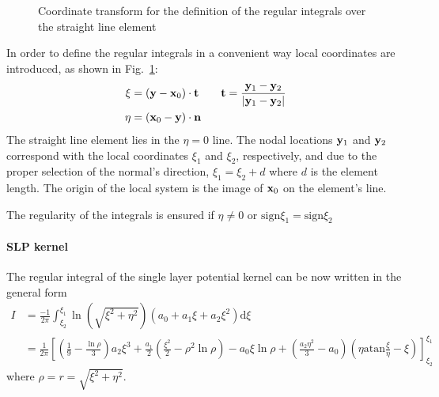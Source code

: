 \documentclass[a4paper,11pt]{article}
\newcommand{\td}{\mathrm{d}}
\newcommand{\sign}{\mathrm{sign}}
\newcommand{\atan}{\mathrm{atan}}
\begin{document}
\begin{figure}
\center
{}
\caption{Coordinate transform for the definition of the regular integrals over the straight line element}
\label{fig:regular_local}
\end{figure}

In order to define the regular integrals in a convenient way local coordinates are introduced, as shown in Fig.~\ref{fig:regular_local}:
%
\begin{align}
\xi &= ({\bf y} - {\bf x}_0) \cdot {\bf t} \qquad {\bf t} = \frac{{\bf y}_1 - {\bf y}_2}{|{\bf y}_1 - {\bf y}_2|} \nonumber \\
\eta &= ({\bf x}_0 - {\bf y}) \cdot {\bf n}
\end{align}
%
The straight line element lies in the $\eta = 0$ line. The nodal locations ${\bf y}_1$ and ${\bf y}_2$ correspond with the local coordinates $\xi_1$ and $\xi_2$, respectively, and due to the proper selection of the normal's direction, $\xi_1 = \xi_2 + d$ where $d$ is the element length. The origin of the local system is the image of ${\bf x}_0$ on the element's line.

The regularity of the integrals is ensured if $\eta \ne 0$ or $\sign \xi_1 = \sign \xi_2$


\paragraph{SLP kernel}

The regular integral of the single layer potential kernel can be now written in the general form
%
\begin{align}
I &= \frac{-1}{2\pi} \int_{\xi_2}^{\xi_1} \ln\left(\sqrt{\xi^2+\eta^2}\right) \left(a_0 + a_1 \xi + a_2 \xi^2\right) \td \xi \\
 &= \frac{1}{2\pi} \left[
\left(\frac{1}{9} - \frac{\ln \rho}{3}\right) a_2 \xi^3
+ \frac{a_1}{2} \left(\frac{\xi^2}{2}
- \rho^2 \ln \rho\right)
- a_0 \xi \ln \rho
+ \left(\frac{a_2 \eta^2}{3} - a_0 \right) \left(\eta \atan\frac{\xi}{\eta} - \xi\right)
\right]_{\xi_2}^{\xi_1} \nonumber
\end{align}
%
where $\rho = r = \sqrt{\xi^2+\eta^2}$.
\end{document}
